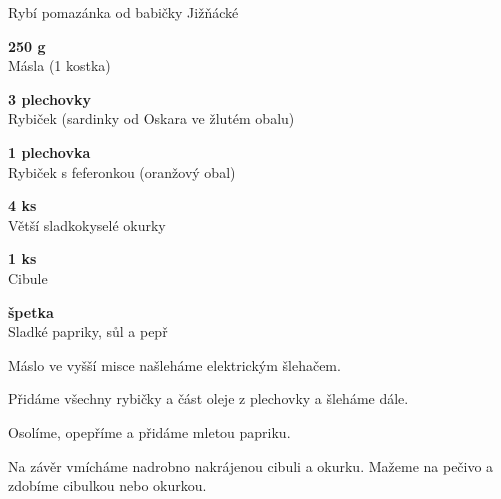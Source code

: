 \documentclass[11pt,a4paper]{article}
\begin{document}
\begin{recipe}[SkyBlue]{Rybí pomazánka od babičky Jižňácké}
    \begin{ingredients}
        \item \parbox[t]{\linewidth}{\raggedright \piece \textbf{250 g}\\ Másla (1 kostka)}
        \item \parbox[t]{\linewidth}{\raggedright \piece \textbf{3 plechovky}\\ Rybiček (sardinky od Oskara ve žlutém obalu)}
        \item \parbox[t]{\linewidth}{\raggedright \piece \textbf{1 plechovka}\\ Rybiček s feferonkou (oranžový obal)}
        \item \parbox[t]{\linewidth}{\raggedright \piece \textbf{4 ks}\\ Větší sladkokyselé okurky}
        \item \parbox[t]{\linewidth}{\raggedright \piece \textbf{1 ks}\\ Cibule}
        \item \parbox[t]{\linewidth}{\raggedright \indefinite \textbf{špetka}\\ Sladké papriky, sůl a pepř}
    \end{ingredients}
    \begin{steps}
        \item Máslo ve vyšší misce našleháme elektrickým šlehačem.
        \item Přidáme všechny rybičky a část oleje z plechovky a šleháme dále.
        \item Osolíme, opepříme a přidáme mletou papriku.
        \item Na závěr vmícháme nadrobno nakrájenou cibuli a okurku. Mažeme na pečivo a zdobíme cibulkou nebo okurkou.
    \end{steps}
\end{recipe}
\end{document}
